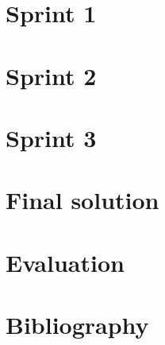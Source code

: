\documentclass[11pt,a4paper,titlepage,oneside]{report}
\begin{document}
\chapter{Sprint 1}

\chapter{Sprint 2}

\chapter{Sprint 3}

\chapter{Final solution}

\chapter{Evaluation}



\chapter{Bibliography}
\begin{flushleft}
    \nocite{leafletjs.com}
    \nocite{openlayers.org}
	
\end{flushleft}

\appendix
\end{document}
